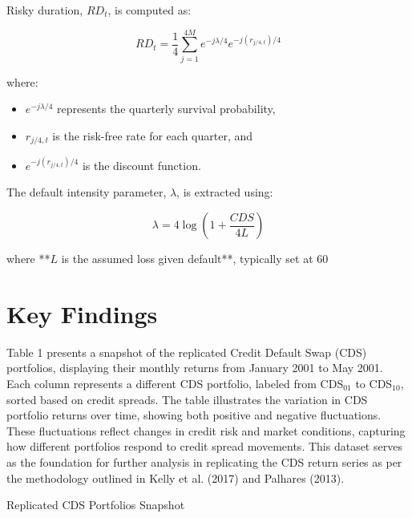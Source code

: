 \documentclass{article}
\begin{document}
Risky duration, $RD_t$, is computed as:

\begin{equation}
    RD_t = \frac{1}{4} \sum_{j=1}^{4M} e^{-j\lambda/4} e^{-j(r_{j/4,t})/4}
\end{equation}

where:
\begin{itemize}
    \item $e^{-j\lambda/4}$ represents the quarterly survival probability,
    \item $r_{j/4,t}$ is the risk-free rate for each quarter, and
    \item $e^{-j(r_{j/4,t})/4}$ is the discount function.
\end{itemize}

The default intensity parameter, $\lambda$, is extracted using:

\begin{equation}
    \lambda = 4 \log \left(1 + \frac{CDS}{4L} \right)
\end{equation}

where **$L$ is the assumed loss given default**, typically set at 60%

\section{Key Findings}

Table 1 presents a snapshot of the replicated Credit Default Swap (CDS) portfolios, displaying their monthly returns from January 2001 to May 2001. Each column represents a different CDS portfolio, labeled from CDS$_{01}$ to CDS$_{10}$, sorted based on credit spreads. The table illustrates the variation in CDS portfolio returns over time, showing both positive and negative fluctuations. These fluctuations reflect changes in credit risk and market conditions, capturing how different portfolios respond to credit spread movements. This dataset serves as the foundation for further analysis in replicating the CDS return series as per the methodology outlined in Kelly et al. (2017) and Palhares (2013).

\begin{table}[H]
    \centering
    \caption{Replicated CDS Portfolios Snapshot}
    \label{tab:cds_snapshot}
    \resizebox{\textwidth}{!}{}  %
\end{table}
\end{document}
